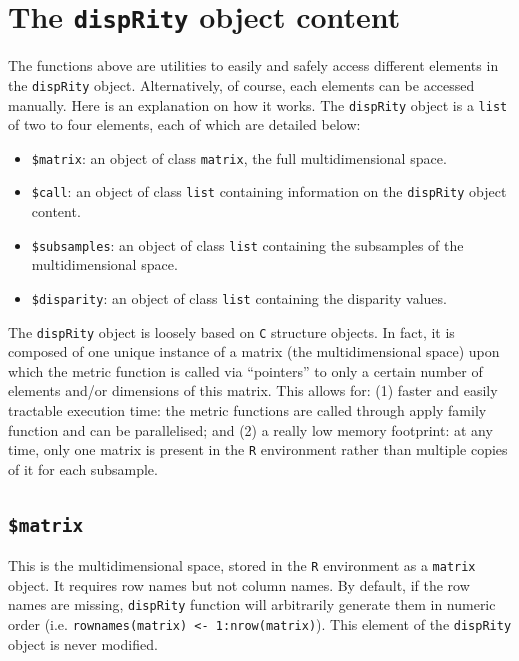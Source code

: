 \documentclass[]{book}
\providecommand{\tightlist}{%
  \setlength{\itemsep}{0pt}\setlength{\parskip}{0pt}}
\theoremstyle{definition}
\theoremstyle{definition}
\theoremstyle{remark}
\begin{document}
\section{\texorpdfstring{The \texttt{dispRity} object
content}{The dispRity object content}}\label{the-disprity-object-content}

The functions above are utilities to easily and safely access different
elements in the \texttt{dispRity} object. Alternatively, of course, each
elements can be accessed manually. Here is an explanation on how it
works. The \texttt{dispRity} object is a \texttt{list} of two to four
elements, each of which are detailed below:

\begin{itemize}
\tightlist
\item
  \texttt{\$matrix}: an object of class \texttt{matrix}, the full
  multidimensional space.
\item
  \texttt{\$call}: an object of class \texttt{list} containing
  information on the \texttt{dispRity} object content.
\item
  \texttt{\$subsamples}: an object of class \texttt{list} containing the
  subsamples of the multidimensional space.
\item
  \texttt{\$disparity}: an object of class \texttt{list} containing the
  disparity values.
\end{itemize}

The \texttt{dispRity} object is loosely based on \texttt{C} structure
objects. In fact, it is composed of one unique instance of a matrix (the
multidimensional space) upon which the metric function is called via
``pointers'' to only a certain number of elements and/or dimensions of
this matrix. This allows for: (1) faster and easily tractable execution
time: the metric functions are called through apply family function and
can be parallelised; and (2) a really low memory footprint: at any time,
only one matrix is present in the \texttt{R} environment rather than
multiple copies of it for each subsample.

\subsection{\texorpdfstring{\texttt{\$matrix}}{\$matrix}}\label{matrix}

This is the multidimensional space, stored in the \texttt{R} environment
as a \texttt{matrix} object. It requires row names but not column names.
By default, if the row names are missing, \texttt{dispRity} function
will arbitrarily generate them in numeric order (i.e.
\texttt{rownames(matrix)\ \textless{}-\ 1:nrow(matrix)}). This element
of the \texttt{dispRity} object is never modified.
\end{document}
